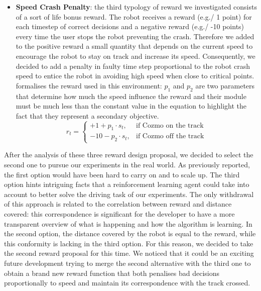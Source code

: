 \begin{itemize}
	\item \textbf{Speed Crash Penalty}: the third typology of reward we investigated consists of a sort of life bonus reward. The robot receives a reward (e.g./ 1 point) for each timestep of correct decisions and a negative reward (e.g./ -10 points) every time the user stops the robot preventing the crash. Therefore we added to the positive reward a small quantity that depends on the current speed to encourage the robot to stay on track and increase its speed. Consequently, we decided to add a penalty in faulty time step proportional to the robot crash speed to entice the robot in avoiding high speed when close to critical points.  formalises the reward used in this environment: $p_1$ and $p_2$ are two parameters that determine how much the speed influence the reward and their module must be much less than the constant value in the equation to highlight the fact that they represent a secondary objective. \cite{raffin2019learning}
	      \begin{equation}
		      r_t = \begin{cases} +1 + p_1 \cdot s_t, & \mbox{if } \mbox{Cozmo on the track} \\ -10 - p_2 \cdot s_t, & \mbox{if } \mbox{Cozmo off the track} \end{cases}
		      \label{eq:speedCrashPenalty}
	      \end{equation}

\end{itemize}

After the analysis of these three reward design proposal, we decided to select the second one to pursue our experiments in the real world. As previously reported, the first option would have been hard to carry on and to scale up. The third option hints intriguing facts that a reinforcement learning agent could take into account to better solve the driving task of our experiments. The only withdrawal of this approach is related to the correlation between reward and distance covered: this correspondence is significant for the developer to have a more transparent overview of what is happening and how the algorithm is learning. In the second option, the distance covered by the robot is equal to the reward, while this conformity is lacking in the third option. For this reason, we decided to take the second reward proposal for this time. We noticed that it could be an exciting future development trying to merge the second alternative with the third one to obtain a brand new reward function that both penalises bad decisions proportionally to speed and maintain its correspondence with the track crossed.

